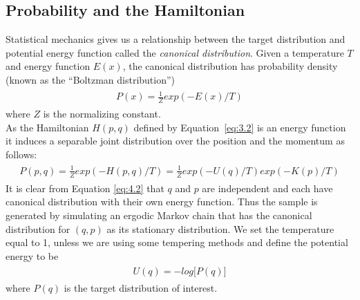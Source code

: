 \documentclass{article}
\numberwithin{equation}{section}
\begin{document}
\subsection{Probability and the Hamiltonian}\label{prob}
Statistical mechanics gives us a relationship between the target distribution and potential energy function called the \textit{canonical distribution}. Given a temperature $T$ and energy function $E(x)$, the canonical distribution has probability density (known as the ``Boltzman distribution'')
\begin{align}
\begin{split}
P(x) = \frac{1}{Z}exp(-E(x)/T)
\end{split}
\label{eq:4.1}
\end{align}
where $Z$ is the normalizing constant.\\
As the Hamiltonian $H(p,q)$ defined by Equation~\ref{eq:3.2}  is an energy function it induces a separable joint distribution over the position and the momentum as follows:
\begin{align}
\begin{split}
P(p,q) = \frac{1}{Z}exp(-H(p,q)/T) = \frac{1}{Z}exp(-U(q)/T)exp(-K(p)/T)
\end{split}
\label{eq:4.2}
\end{align}
It is clear from Equation \ref{eq:4.2} that $q$ and $p$ are independent and each have canonical distribution with their own energy function. Thus the sample is generated by simulating an ergodic Markov chain that has the canonical distribution for $(q,p)$ as its stationary distribution.
We set the temperature equal to 1, unless we are using some tempering methods and define the potential energy to be
\begin{align}
\begin{split}
U(q) = -log \big[P(q)\big]
\end{split}
\label{eq:4.4}
\end{align}
where $P(q)$ is the target distribution of interest.
\end{document}
